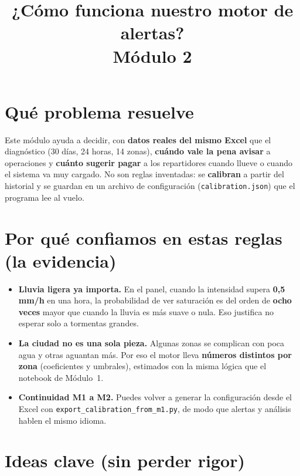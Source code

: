 \documentclass[11pt,a4paper]{article}
\title{\textbf{¿Cómo funciona nuestro motor de alertas?}\\[0.2em]
{\large Módulo 2}}
\author{}
\date{}
\begin{document}
\maketitle
\vspace{-0.4em}

\section*{Qué problema resuelve}

\noindent Este módulo ayuda a decidir, con \textbf{datos reales del mismo Excel} que el diagnóstico (30 días, 24 horas, 14 zonas), \textbf{cuándo vale la pena avisar} a operaciones y \textbf{cuánto sugerir pagar} a los repartidores cuando llueve o cuando el sistema va muy cargado. No son reglas inventadas: se \textbf{calibran} a partir del historial y se guardan en un archivo de configuración (\texttt{calibration.json}) que el programa lee al vuelo.

\section*{Por qué confiamos en estas reglas (la evidencia)}

\begin{itemize}
  \item \textbf{Lluvia ligera ya importa.} En el panel, cuando la intensidad supera \textbf{0{,}5\,mm/h} en una hora, la probabilidad de ver saturación es del orden de \textbf{ocho veces} mayor que cuando la lluvia es más suave o nula. Eso justifica no esperar solo a tormentas grandes.
  \item \textbf{La ciudad no es una sola pieza.} Algunas zonas se complican con poca agua y otras aguantan más. Por eso el motor lleva \textbf{números distintos por zona} (coeficientes y umbrales), estimados con la misma lógica que el notebook de Módulo~1.
  \item \textbf{Continuidad M1 a M2.} Puedes volver a generar la configuración desde el Excel con \texttt{export\_calibration\_from\_m1.py}, de modo que alertas y análisis hablen el mismo idioma.
\end{itemize}

\section*{Ideas clave (sin perder rigor)}
\end{document}

